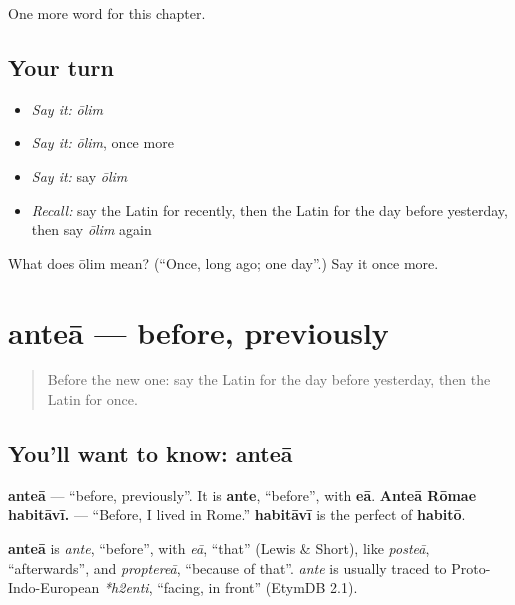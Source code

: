 \begin{grammarlens}[title={What you've built}]
One more word for this chapter.
\end{grammarlens}

\subsection*{Your turn}
\begin{itemize}
\raggedright
  \item \emph{Say it:} \emph{ōlim}
  \item \emph{Say it:} \emph{ōlim}, once more
  \item \emph{Say it:} say \emph{ōlim}
  \item \emph{Recall:} say the Latin for recently, then the Latin for the day before yesterday, then say \emph{ōlim} again
\end{itemize}

\begin{tcolorbox}[breakable,colback=teal!4,colframe=teal!35!black,title={Before you move on}]
What does ōlim mean? (\textquotedblleft{}Once, long ago; one day\textquotedblright{}.) Say it once more.
\end{tcolorbox}
\section[anteā]{anteā — before, previously}

\label{lesson:LA-C162-antea}



\begin{quote}
Before the new one: say the Latin for the day before yesterday, then the Latin for once.
\end{quote}

\subsection*{You'll want to know: anteā}
\textbf{anteā} — \textquotedblleft{}before, previously\textquotedblright{}. It is \textbf{ante}, \textquotedblleft{}before\textquotedblright{}, with \textbf{eā}. \textbf{Anteā Rōmae habitāvī.} — \textquotedblleft{}Before, I lived in Rome.\textquotedblright{} \textbf{habitāvī} is the perfect of \textbf{habitō}.

\begin{cousinweb}
\textbf{anteā} is \emph{ante}, \textquotedblleft{}before\textquotedblright{}, with \emph{eā}, \textquotedblleft{}that\textquotedblright{} (Lewis \& Short), like \emph{posteā}, \textquotedblleft{}afterwards\textquotedblright{}, and \emph{proptereā}, \textquotedblleft{}because of that\textquotedblright{}. \emph{ante} is usually traced to Proto-Indo-European \emph{*h2enti}, \textquotedblleft{}facing, in front\textquotedblright{} (EtymDB 2.1).
\end{cousinweb}

